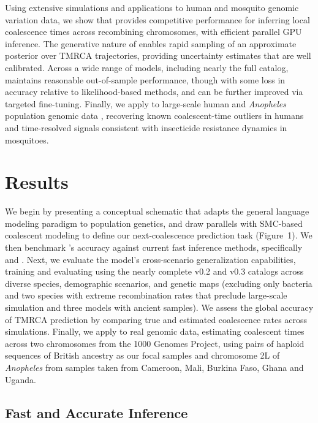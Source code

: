 \documentclass[9pt,twocolumn,twoside]{pnas-new}
\begin{document}
Using extensive simulations and applications to human and mosquito genomic variation data,
we show that \cxtkit provides competitive performance for
inferring local coalescence times across recombining chromosomes,
with efficient parallel GPU inference.
The generative nature of \cxtkit enables rapid sampling of an approximate posterior over TMRCA trajectories,
providing uncertainty estimates that are well calibrated.
Across a wide range of models, including nearly the full \stdpopsim catalog,
\cxtkit maintains reasonable out-of-sample performance, though with some loss in accuracy relative to likelihood-based methods, and can be further improved via targeted fine-tuning.
Finally, we apply \cxtkit to large-scale human and \textit{Anopheles} population genomic data
\cite{10002010map, auton20151000, anopheles2017genetic, clarkson2020genome},
recovering known coalescent-time outliers in humans and time-resolved signals consistent with insecticide resistance dynamics in mosquitoes.

\section*{Results}

We begin by presenting a conceptual schematic that adapts the general language modeling paradigm to population genetics, and draw parallels with SMC-based coalescent modeling to define our next-coalescence prediction task (Figure~1). We then benchmark \cxtkit's accuracy against current fast inference 
methods, specifically \singer and \smcpp \cite{deng_robust_2024, terhorst_robust_2017}. 
Next, we evaluate the model's cross-scenario generalization capabilities, 
training and evaluating using the nearly complete \stdpopsim v0.2 and v0.3 catalogs \cite{adrion2020community, gower2023expanding} across diverse species, demographic scenarios, and genetic maps (excluding only bacteria and two species with extreme recombination rates that preclude large-scale simulation and three models with ancient samples). 
We assess the global accuracy of TMRCA prediction by comparing true and estimated coalescence rates across simulations. 
Finally, we apply \cxtkit to real genomic data, estimating coalescent times across two
chromosomes from the 1000 Genomes Project, using pairs of haploid sequences of British ancestry as our focal samples and chromosome 2L of \textit{Anopheles} from samples taken from Cameroon, Mali, Burkina Faso, Ghana and Uganda.




\subsection*{Fast and Accurate Inference}
\end{document}
